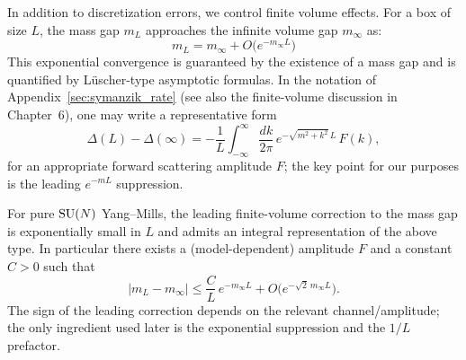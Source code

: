  In addition to discretization errors, we control finite volume effects. For a box of size $L$, the mass gap $m_L$ approaches the infinite volume gap $m_\infty$ as:
\begin{equation}
m_L = m_\infty + O\bigl(e^{-m_\infty L}\bigr)
\end{equation}
This exponential convergence is guaranteed by the existence of a mass gap and is quantified by Lüscher-type asymptotic formulas. In the notation of Appendix~\ref{sec:symanzik_rate} (see also the finite-volume discussion in Chapter~6), one may write a representative form
\begin{equation}
\Delta(L) - \Delta(\infty) = - \frac{1}{L} \int_{-\infty}^\infty \frac{dk}{2\pi}\, e^{-\sqrt{m^2+k^2}\,L}\, F(k),
\end{equation}
for an appropriate forward scattering amplitude $F$; the key point for our purposes is the leading $e^{-mL}$ suppression.

\begin{lemma}
For pure $\mathrm{SU}(N)$ Yang--Mills, the leading finite-volume correction to the mass gap is exponentially small in $L$ and admits an integral representation of the above type. In particular there exists a (model-dependent) amplitude $F$ and a constant $C>0$ such that
\begin{equation}
|m_L - m_\infty| \le \frac{C}{L}\, e^{-m_\infty L} + O\bigl(e^{-\sqrt{2}\, m_\infty L}\bigr).
\end{equation}
The sign of the leading correction depends on the relevant channel/amplitude; the only ingredient used later is the exponential suppression and the $1/L$ prefactor.
\end{lemma}


